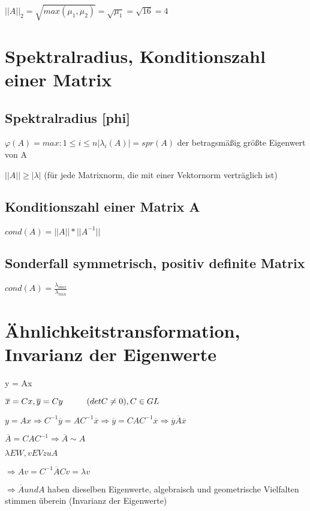 \documentclass[12pt,a4paper]{article} %
\newcommand*\conj[1]{\overline{#1}}
\newcommand*\tab[1][1cm]{\hspace*{#1}}
\begin{document}
	$||A||_2 = \sqrt{max(\mu_1, \mu_2)} = \sqrt{\mu_1} = \sqrt{16} = 4$
	
	\newpage
	
	\section{Spektralradius, Konditionszahl einer Matrix}
	
	\subsection{Spektralradius [phi]}
	
	$\varphi(A) = max:{1 \le i \le n} |\lambda_i(A)| = spr(A)$ der betragsmäßig größte Eigenwert von A
	
	$||A|| \ge |\lambda|$ (für jede Matrixnorm, die mit einer Vektornorm verträglich ist)
	
	\subsection{Konditionszahl einer Matrix A}
	
	$cond(A) = ||A||*||A^{-1}||$
	
	\subsection{Sonderfall symmetrisch, positiv definite Matrix}
	
	$cond(A) = \frac{ \lambda_{max}}{ \lambda_{min}}$
	
	\newpage
	
	\section{Ähnlichkeitstransformation, Invarianz der Eigenwerte}
	
	y = Ax
	
	$\conj{x} = Cx, \conj{y} = Cy \tab (det C \ne 0), C \in GL$ 
	
	$y = Ax \Rightarrow C^{-1} \conj{y} = AC^{-1} \conj{x} \Rightarrow \conj{y} = CAC^{-1} \conj{x} \Rightarrow \conj{y}\conj{A}\conj{x}$
	
	$\conj{A} = CAC^{-1} \Rightarrow \conj{A} \sim A$
	
	$\lambda EW, v EV zu A$
	
	$\Rightarrow Av = C^{-1}\conj{A}Cv = \lambda v$
	
	$\Rightarrow \conj{A} und A $ haben dieselben Eigenwerte, algebraisch und geometrische Vielfalten stimmen überein (Invarianz der Eigenwerte)
	
\end{document}
